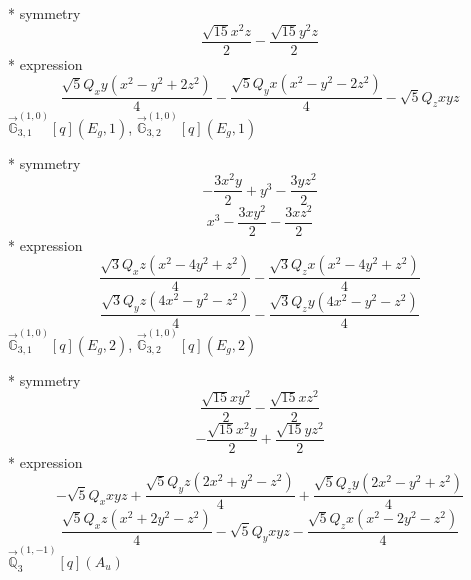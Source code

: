 \documentclass[fleqn,8pt]{jsarticle}
\begin{document}
\noindent\quad ** symmetry
\begin{dmath*}
\frac{\sqrt{15} x^{2} z}{2} - \frac{\sqrt{15} y^{2} z}{2}
\end{dmath*}
\noindent\quad ** expression
\begin{dmath*}
\frac{\sqrt{5} Q_{x} y \left(x^{2} - y^{2} + 2 z^{2}\right)}{4} - \frac{\sqrt{5} Q_{y} x \left(x^{2} - y^{2} - 2 z^{2}\right)}{4} - \sqrt{5} Q_{z} x y z
\end{dmath*}
\noindent\quad $\vec{\mathbb{G}}_{3,1}^{(1,0)}[q](E_{g},1)$, $\vec{\mathbb{G}}_{3,2}^{(1,0)}[q](E_{g},1)$

\noindent\quad ** symmetry
\begin{dmath*}
- \frac{3 x^{2} y}{2} + y^{3} - \frac{3 y z^{2}}{2}
\end{dmath*}
\begin{dmath*}
x^{3} - \frac{3 x y^{2}}{2} - \frac{3 x z^{2}}{2}
\end{dmath*}
\noindent\quad ** expression
\begin{dmath*}
\frac{\sqrt{3} Q_{x} z \left(x^{2} - 4 y^{2} + z^{2}\right)}{4} - \frac{\sqrt{3} Q_{z} x \left(x^{2} - 4 y^{2} + z^{2}\right)}{4}
\end{dmath*}
\begin{dmath*}
\frac{\sqrt{3} Q_{y} z \left(4 x^{2} - y^{2} - z^{2}\right)}{4} - \frac{\sqrt{3} Q_{z} y \left(4 x^{2} - y^{2} - z^{2}\right)}{4}
\end{dmath*}
\noindent\quad $\vec{\mathbb{G}}_{3,1}^{(1,0)}[q](E_{g},2)$, $\vec{\mathbb{G}}_{3,2}^{(1,0)}[q](E_{g},2)$

\noindent\quad ** symmetry
\begin{dmath*}
\frac{\sqrt{15} x y^{2}}{2} - \frac{\sqrt{15} x z^{2}}{2}
\end{dmath*}
\begin{dmath*}
- \frac{\sqrt{15} x^{2} y}{2} + \frac{\sqrt{15} y z^{2}}{2}
\end{dmath*}
\noindent\quad ** expression
\begin{dmath*}
- \sqrt{5} Q_{x} x y z + \frac{\sqrt{5} Q_{y} z \left(2 x^{2} + y^{2} - z^{2}\right)}{4} + \frac{\sqrt{5} Q_{z} y \left(2 x^{2} - y^{2} + z^{2}\right)}{4}
\end{dmath*}
\begin{dmath*}
\frac{\sqrt{5} Q_{x} z \left(x^{2} + 2 y^{2} - z^{2}\right)}{4} - \sqrt{5} Q_{y} x y z - \frac{\sqrt{5} Q_{z} x \left(x^{2} - 2 y^{2} - z^{2}\right)}{4}
\end{dmath*}
\noindent\quad $\vec{\mathbb{Q}}_{3}^{(1,-1)}[q](A_{u})$
\end{document}
